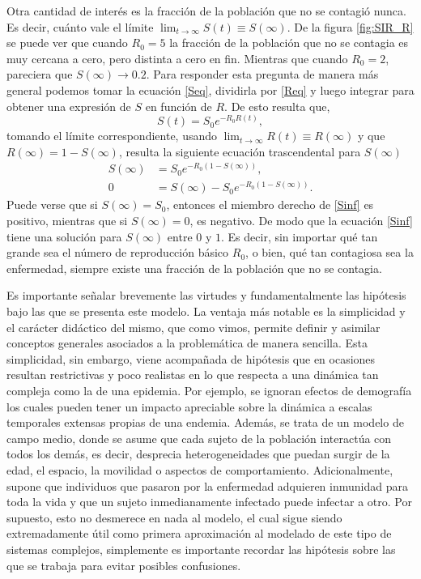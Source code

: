 Otra cantidad de interés es la fracción de la población que no se contagió nunca. Es decir, cuánto vale el límite $\lim_{t \to \infty} S(t) \equiv S(\infty)$. De la figura 
\ref{fig:SIR_R} se puede ver que cuando $R_0=5$ la fracción de la población que no se 
contagia es muy cercana a cero, pero distinta a cero en fin. Mientras que cuando $R_0 = 2$, pareciera que $S(\infty) \to 0.2$. Para responder esta pregunta de manera más 
general podemos tomar la ecuación \ref{Seq}, dividirla por \ref{Req} y luego integrar para obtener una expresión de $S$ en función de $R$. De esto resulta que,
$$S(t) = S_0 e^{-R_0R(t)},$$
tomando el límite correspondiente, usando $\lim_{t \to \infty}R(t)\equiv R(\infty)$ y que $R(\infty) = 1 - S(\infty)$, resulta la siguiente ecuación trascendental 
para $S(\infty)$
\begin{align}
  S(\infty) &= S_0 e^{-R_0 (1 - S(\infty))},\nonumber \\
  0 &= S(\infty) - S_0 e^{-R_0 \left(1 - S(\infty)\right)}.  \label{Sinf}
\end{align}
Puede verse que si $S(\infty) = S_0$, entonces el miembro derecho de \ref{Sinf} es positivo, mientras que si $S(\infty) = 0$, es negativo. De modo que la ecuación 
\ref{Sinf} tiene una solución para $S(\infty)$ entre $0$ y $1$. Es decir, sin importar qué tan grande sea el número de reproducción básico $R_0$, o bien, qué tan 
contagiosa sea la enfermedad, siempre existe una fracción de la población que no se contagia.

Es importante señalar brevemente las virtudes y fundamentalmente las hipótesis bajo las que se presenta este modelo. La ventaja más notable es la 
simplicidad y el carácter didáctico del mismo, que como vimos, permite definir y asimilar conceptos generales asociados a la problemática de manera sencilla.
Esta simplicidad, sin embargo, viene acompañada de hipótesis que en ocasiones resultan restrictivas y poco realistas en lo que respecta a una dinámica
tan compleja como la de una epidemia. Por ejemplo, se ignoran efectos de demografía los cuales
pueden tener un impacto apreciable sobre la dinámica a escalas temporales extensas propias de una endemia. Además, se trata de un modelo de campo medio, 
donde se asume que cada sujeto de la población interactúa con todos los demás, es decir, desprecia heterogeneidades que puedan surgir de la edad, el 
espacio, la movilidad o aspectos de comportamiento. Adicionalmente, supone que individuos que pasaron por la enfermedad adquieren inmunidad para toda la vida y que
un sujeto inmedianamente infectado puede infectar a otro. Por supuesto, esto no desmerece en nada al modelo, el cual sigue siendo extremadamente útil como primera 
aproximación al modelado de este tipo de sistemas complejos, simplemente es importante recordar las hipótesis sobre las que se trabaja para evitar posibles confusiones.

